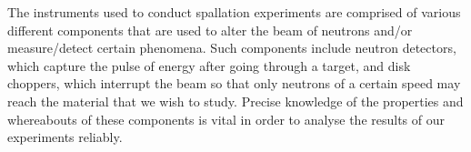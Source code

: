 The instruments used to conduct spallation experiments are comprised of various different components that are used to alter the beam of neutrons and/or measure/detect certain phenomena. Such components include neutron detectors, which capture the pulse of energy after going through a target, and disk choppers, which interrupt the beam so that only neutrons of a certain speed may reach the material that we wish to study. Precise knowledge of the properties and whereabouts of these components is vital in order to analyse the results of our experiments reliably. 
